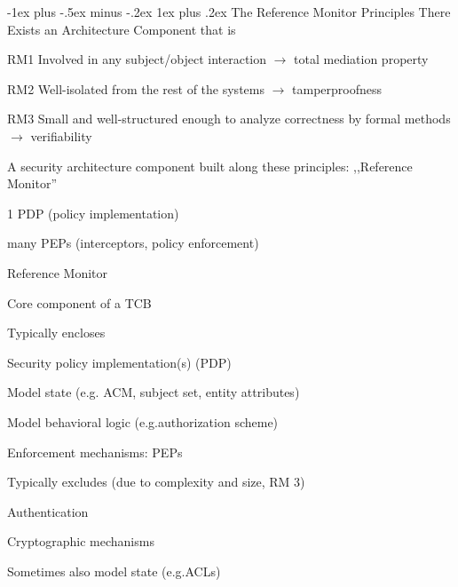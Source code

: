 \documentclass[a4paper]{article}
\makeatletter
\renewcommand{\subsubsection}{\@startsection{subsubsection}{3}{0mm}%
                {-1ex plus -.5ex minus -.2ex}%
                {1ex plus .2ex}%
                {\normalfont\small\bfseries}}
\makeatother
\begin{document}
\begin{multicols}{3}
    \subsubsection{The Reference Monitor Principles}
    There Exists an Architecture Component that is
    \begin{itemize*}
        \item[RM1] Involved in any subject/object interaction $\rightarrow$ total mediation property
        \item[RM2] Well-isolated from the rest of the systems $\rightarrow$ tamperproofness
        \item[RM3] Small and well-structured enough to analyze correctness by formal methods $\rightarrow$ verifiability
    \end{itemize*}

    A security architecture component built along these principles: ,,Reference Monitor''
    \begin{itemize*}
        \item 1 PDP (policy implementation)
        \item many PEPs (interceptors, policy enforcement)
    \end{itemize*}

    Reference Monitor
    \begin{itemize*}
        \item Core component of a TCB
        \item Typically encloses
        \begin{itemize*}
            \item Security policy implementation(s) (PDP)
            \begin{itemize*}
                \item Model state (e.g. ACM, subject set, entity attributes)
                \item Model behavioral logic (e.g.authorization scheme)
            \end{itemize*}
            \item Enforcement mechanisms: PEPs
        \end{itemize*}
        \item Typically excludes (due to complexity and size, RM 3)
        \begin{itemize*}
            \item Authentication
            \item Cryptographic mechanisms
            \item Sometimes also model state (e.g.ACLs)
        \end{itemize*}
    \end{itemize*}


\end{multicols}
\end{document}
